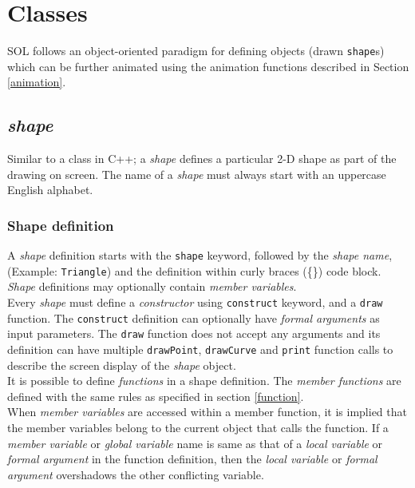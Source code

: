 \section{Classes} \label{classes}
SOL follows an object-oriented paradigm for defining objects (drawn \texttt{shape}s) which can be further animated using the animation functions described in Section \ref{animation}.

    \subsection{\textit{shape}}
    Similar to a class in C++; a \textit{shape} defines a particular 2-D shape as part of the drawing on screen. The name of a \textit{shape} must always start with an uppercase English alphabet.

    \subsubsection{Shape definition}
    A \textit{shape} definition starts with the \texttt{shape} keyword, followed by the \textit{shape name},(Example: \texttt{Triangle}) and the definition within curly braces (\{\}) code block. \textit{Shape} definitions may optionally contain \textit{member variables}.\\
    
    Every \textit{shape} must define a \textit{constructor} using \texttt{construct} keyword, and a \texttt{draw} function. The \texttt{construct} definition can optionally have \textit{formal arguments} as input parameters. The \texttt{draw} function does not accept any arguments and its definition can have multiple \texttt{drawPoint}, \texttt{drawCurve} and \texttt{print} function calls to describe the screen display of the \textit{shape} object.\\

    It is possible to define \textit{functions} in a shape definition. The \textit{member functions} are defined with the same rules as specified in section \ref{function}.\\
    When \textit{member variables} are accessed within a member function, it is implied that the member variables belong to the current object that calls the function. If a \textit{member variable} or \textit{global variable} name is same as that of a \textit{local variable} or \textit{formal argument} in the function definition, then the \textit{local variable} or \textit{formal argument} overshadows the other conflicting variable.\\

